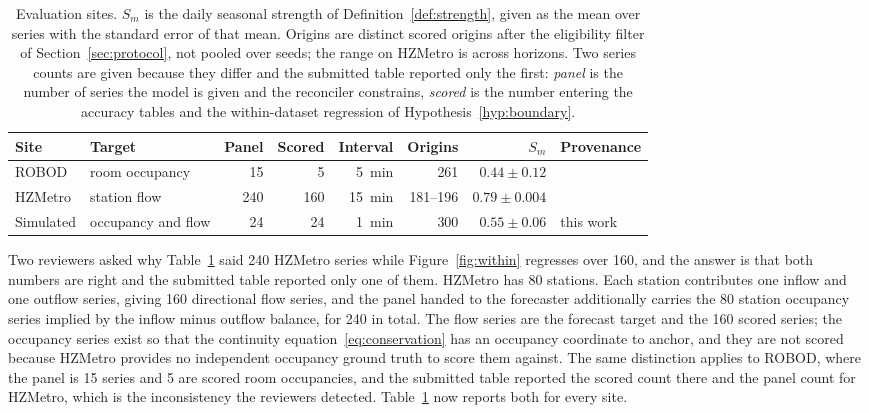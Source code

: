 \documentclass[11pt]{article}
\theoremstyle{plain}
\theoremstyle{definition}
\theoremstyle{remark}
\newif\ifrevisionmarkup
\newcommand{\new}[1]{\ifrevisionmarkup\textcolor{revision}{#1}\else#1\fi}
\begin{document}
\begin{table}[htbp]
\centering
\caption{Evaluation sites. $S_m$ is the daily seasonal strength of Definition~\ref{def:strength}, given as the mean over series with the standard error of that mean. Origins are distinct scored origins after the eligibility filter of Section~\ref{sec:protocol}, not pooled over seeds; the range on HZMetro is across horizons. \new{Two series counts are given because they differ and the submitted table reported only the first: \emph{panel} is the number of series the model is given and the reconciler constrains, \emph{scored} is the number entering the accuracy tables and the within-dataset regression of Hypothesis~\ref{hyp:boundary}.}}
\label{tab:data}
\small
\begin{tabular}{llrrrrrl}
\toprule
Site & Target & \new{Panel} & \new{Scored} & Interval & Origins & $S_m$ & Provenance \\
\midrule
ROBOD    & room occupancy  & \new{15} & \new{5}   & \SI{5}{\minute}  & 261 & $0.44 \pm 0.12$ & \citet{tekler2022robod} \\
HZMetro  & station flow    & \new{240} & \new{160} & \SI{15}{\minute} & 181--196 & $0.79 \pm 0.004$ & \citet{liu2022pvcgn} \\
Simulated & occupancy and flow & \new{24} & \new{24} & \SI{1}{\minute} & 300 & $0.55 \pm 0.06$ & this work \\
\bottomrule
\end{tabular}
\end{table}

\new{Two reviewers asked why Table~\ref{tab:data} said \num{240} HZMetro series while Figure~\ref{fig:within} regresses over \num{160}, and the answer is that both numbers are right and the submitted table reported only one of them. HZMetro has \num{80} stations. Each station contributes one inflow and one outflow series, giving \num{160} directional flow series, and the panel handed to the forecaster additionally carries the \num{80} station occupancy series implied by the inflow minus outflow balance, for \num{240} in total. The flow series are the forecast target and the \num{160} scored series; the occupancy series exist so that the continuity equation~\eqref{eq:conservation} has an occupancy coordinate to anchor, and they are not scored because HZMetro provides no independent occupancy ground truth to score them against. The same distinction applies to ROBOD, where the panel is \num{15} series and \num{5} are scored room occupancies, and the submitted table reported the scored count there and the panel count for HZMetro, which is the inconsistency the reviewers detected. Table~\ref{tab:data} now reports both for every site.}
\end{document}
